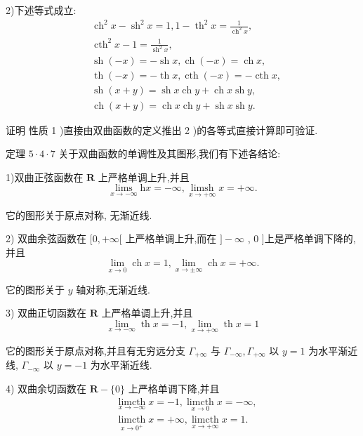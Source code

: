 2)下述等式成立:
\begin{align*}
	&{\operatorname{ch}}^{2}x - {\operatorname{sh}}^{2}x = 1,1 - {\operatorname{th}}^{2}x = \frac{1}{{\operatorname{ch}}^{2}x},\\
	&{\operatorname{cth}}^{2}x - 1 = \frac{1}{{\operatorname{sh}}^{2}x},\\
	&\operatorname{sh}\left( {-x}\right)  =  - \operatorname{sh}x,\operatorname{ch}\left( {-x}\right)  = \operatorname{ch}x,\\
	&\operatorname{th}\left( {-x}\right)  =  - \operatorname{th}x,\operatorname{cth}\left( {-x}\right)  =  - \operatorname{cth}x,\\
	&\operatorname{sh}\left( {x + y}\right)  = \operatorname{sh}x\operatorname{ch}y + \operatorname{ch}x\operatorname{sh}y,\\
	&\operatorname{ch}\left( {x + y}\right)  = \operatorname{ch}x\operatorname{ch}y + \operatorname{sh}x\operatorname{sh}y.
\end{align*}

证明 性质 1 )直接由双曲函数的定义推出 2 )的各等式直接计算即可验证.

定理 $5 \cdot  4 \cdot  7$ 关于双曲函数的单调性及其图形,我们有下述各结论:

1)双曲正弦函数在 $\mathbf{R}$ 上严格单调上升,并且
$$\mathop{\operatorname{lims}}\limits_{{x \rightarrow   - \infty }}\mathrm{h}x =  - \infty ,\mathop{\operatorname{limsh}}\limits_{{x \rightarrow   + \infty }}x =  + \infty .$$

它的图形关于原点对称, 无渐近线.

2) 双曲余弦函数在 $\lbrack 0, + \infty \lbrack$ 上严格单调上升,而在 $\rbrack  - \infty$ , 0 ]上是严格单调下降的, 并且
$$\mathop{\lim }\limits_{{x \rightarrow  0}}\operatorname{ch}x = 1,\mathop{\lim }\limits_{{x \rightarrow   \pm  \infty }}\operatorname{ch}x =  + \infty .$$

它的图形关于 $y$ 轴对称,无渐近线.

3) 双曲正切函数在 $\mathbf{R}$ 上严格单调上升,并且
$$\mathop{\lim }\limits_{{x \rightarrow   - \infty }}\operatorname{th}x =  - 1,\mathop{\lim }\limits_{{x \rightarrow   + \infty }}\operatorname{th}x = 1$$

它的图形关于原点对称,并且有无穷远分支 ${\Gamma }_{+\infty }$ 与 ${\Gamma }_{-\infty },{\Gamma }_{+\infty }$ 以 $y = 1$ 为水平渐近线, ${\Gamma }_{-\infty }$ 以 $y =  - 1$ 为水平渐近线.

4) 双曲余切函数在 $\mathbf{R} - \{ 0\}$ 上严格单调下降,并且
\begin{align*}
	&\mathop{\operatorname{limcth}}\limits_{{x \rightarrow   - \infty }}x =  - 1,\mathop{\operatorname{limcth}}\limits_{{x \rightarrow  0}}x =  - \infty ,\\
	&\mathop{\operatorname{limcth}}\limits_{{x \rightarrow  {0}^{ + }}}x =  + \infty ,\mathop{\operatorname{limcth}}\limits_{{x \rightarrow   + \infty }}x = 1.
\end{align*}

